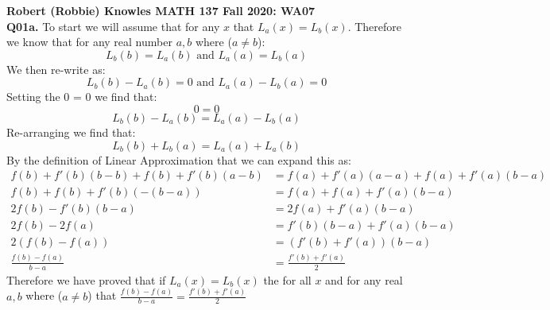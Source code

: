 \documentclass[11pt]{article}
\begin{document}
\parindent=0pt

\textbf{Robert (Robbie) Knowles MATH 137 Fall 2020: WA07}\\

\textbf{Q01a.} To start we will assume that for any $x$ that $L_a(x) = L_b(x)$. Therefore we know that for any real number $a,b$ where ($a \neq b$):
\[ L_b(b) = L_a(b)  \text{  and   } L_a(a) = L_b(a)\] 
We then re-write as:
\[ L_b(b) -  L_a(b) = 0  \text{  and   } L_a(a) - L_b(a) = 0\] 
Setting the 0 = 0 we find that:
\[ 0 = 0 \] 
\[ L_b(b) -  L_a(b) =  L_a(a)  - L_b(a) \] 
Re-arranging we find that:
\[L_b(b)+ L_b(a)  = L_a(a) + L_a(b) \]
By the definition of Linear Approximation that we can expand this as:
\begin{align*}
f(b)+f'(b)(b-b)+f(b)+f'(b)(a-b) & =  f(a)+f'(a)(a-a)+f(a)+f'(a)(b-a)\\
f(b)+f(b)+f'(b)(-(b-a)) & = f(a)+f(a)+f'(a)(b-a)\\
2f(b)-f'(b)(b-a)  &= 2f(a)+ f'(a)(b-a)\\
2f(b) - 2f(a) &= f'(b)(b-a) + f'(a)(b-a)\\
2(f(b) - f(a)) &= (f'(b) + f'(a))(b-a)\\
\frac{f(b)-f(a)}{b-a} &= \frac{f'(b)+f'(a)}{2}
\end{align*}
Therefore we have proved that if $L_a(x) = L_b(x)$ the for all $x$ and for any real $a,b$ where ($a \neq b$) that $\frac{f(b)-f(a)}{b-a} = \frac{f'(b)+f'(a)}{2}$\\\\\\\\\\\\\\\\\\\\\\\\\\
\end{document}
